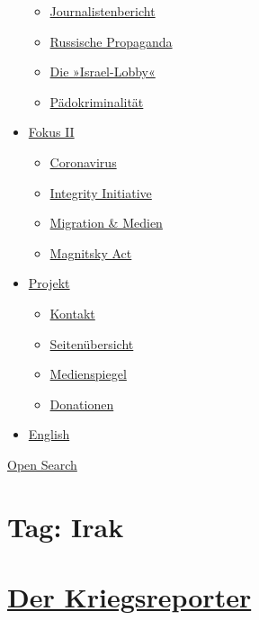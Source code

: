 \begin{itemize}
  \begin{itemize}
  \tightlist
  \item
    \href{https://swprs.org/bericht-eines-journalisten/}{Journalistenbericht}
  \item
    \href{https://swprs.org/russische-propaganda/}{Russische Propaganda}
  \item
    \href{https://swprs.org/die-israel-lobby-fakten-und-mythen/}{Die
    »Israel-Lobby«}
  \item
    \href{https://swprs.org/geopolitik-und-paedokriminalitaet/}{Pädokriminalität}
  \end{itemize}
\item
  \href{https://swprs.org/migration-und-medien/}{Fokus II}

  \begin{itemize}
  \tightlist
  \item
    \href{https://swprs.org/covid-19-hinweis-ii/}{Coronavirus}
  \item
    \href{https://swprs.org/die-integrity-initiative/}{Integrity
    Initiative}
  \item
    \href{https://swprs.org/migration-und-medien/}{Migration \& Medien}
  \item
    \href{https://swprs.org/der-fall-magnitsky/}{Magnitsky Act}
  \end{itemize}
\item
  \href{https://swprs.org/kontakt/}{Projekt}

  \begin{itemize}
  \tightlist
  \item
    \href{https://swprs.org/kontakt/}{Kontakt}
  \item
    \href{https://swprs.org/uebersicht/}{Seitenübersicht}
  \item
    \href{https://swprs.org/medienspiegel/}{Medienspiegel}
  \item
    \href{https://swprs.org/donationen/}{Donationen}
  \end{itemize}
\item
  \href{https://swprs.org/contact/}{English}
\end{itemize}

\protect\hyperlink{}{Open Search}

\hypertarget{tag-irak}{%
\section{Tag: Irak}\label{tag-irak}}

\hypertarget{der-kriegsreporter}{%
\section{\texorpdfstring{\href{https://swprs.org/2017/03/01/der-kriegsreporter/}{Der
Kriegsreporter}}{Der Kriegsreporter}}\label{der-kriegsreporter}}

